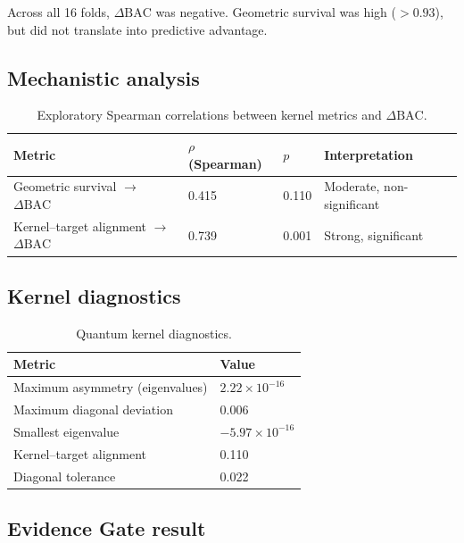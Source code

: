 \documentclass[11pt,a4paper]{article}
\newcommand{\BAC}{\mathrm{BAC}}
\begin{document}
Across all 16 folds, $\Delta\BAC$ was negative. Geometric survival was high
($>0.93$), but did not translate into predictive advantage.

\subsection{Mechanistic analysis}
\label{ssec:correlation}

\begin{table}[htbp]
\centering
\caption{Exploratory Spearman correlations between kernel metrics and
         $\Delta\BAC$.}
\label{tab:correlation}
\smallskip
\begin{tabular}{@{}llll@{}}
\toprule
Metric & $\rho$ (Spearman) & $p$ & Interpretation \\
\midrule
Geometric survival $\to$ $\Delta\BAC$     & 0.415 & 0.110 & Moderate, non-significant \\
Kernel--target alignment $\to$ $\Delta\BAC$ & 0.739 & 0.001 & Strong, significant \\
\bottomrule
\end{tabular}
\end{table}

\subsection{Kernel diagnostics}
\label{ssec:kdiag}

\begin{table}[htbp]
\centering
\caption{Quantum kernel diagnostics.}
\label{tab:kdiag}
\smallskip
\begin{tabular}{@{}ll@{}}
\toprule
Metric & Value \\
\midrule
Maximum asymmetry (eigenvalues)   & $2.22\times10^{-16}$ \\
Maximum diagonal deviation       & 0.006 \\
Smallest eigenvalue              & $-5.97\times10^{-16}$ \\
Kernel--target alignment         & 0.110 \\
Diagonal tolerance               & 0.022 \\
\bottomrule
\end{tabular}
\end{table}

\subsection{Evidence Gate result}
\label{ssec:egate}
\end{document}
